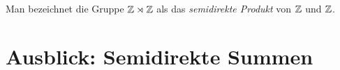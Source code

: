Man bezeichnet die Gruppe $\mathbb{Z} \rtimes \mathbb{Z}$ als das \emph{semidirekte Produkt} von $\mathbb{Z}$ und $\mathbb{Z}$.


\section{Ausblick: Semidirekte Summen}


































